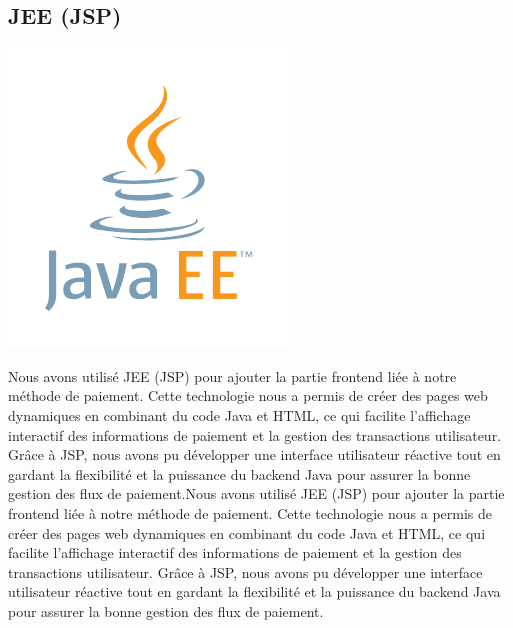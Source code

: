 \subsection{JEE (JSP)}
\begin{center}
    \centering
    \includegraphics[scale=0.5]{Figures/jee.png}
    \label{fig:processus}
\end{center} 
Nous avons utilisé JEE (JSP) pour ajouter la partie frontend liée à notre méthode de paiement. Cette technologie nous a permis de créer des pages web dynamiques en combinant du code Java et HTML, ce qui facilite l'affichage interactif des informations de paiement et la gestion des transactions utilisateur. Grâce à JSP, nous avons pu développer une interface utilisateur réactive tout en gardant la flexibilité et la puissance du backend Java pour assurer la bonne gestion des flux de paiement.Nous avons utilisé JEE (JSP) pour ajouter la partie frontend liée à notre méthode de paiement. Cette technologie nous a permis de créer des pages web dynamiques en combinant du code Java et HTML, ce qui facilite l'affichage interactif des informations de paiement et la gestion des transactions utilisateur. Grâce à JSP, nous avons pu développer une interface utilisateur réactive tout en gardant la flexibilité et la puissance du backend Java pour assurer la bonne gestion des flux de paiement.

